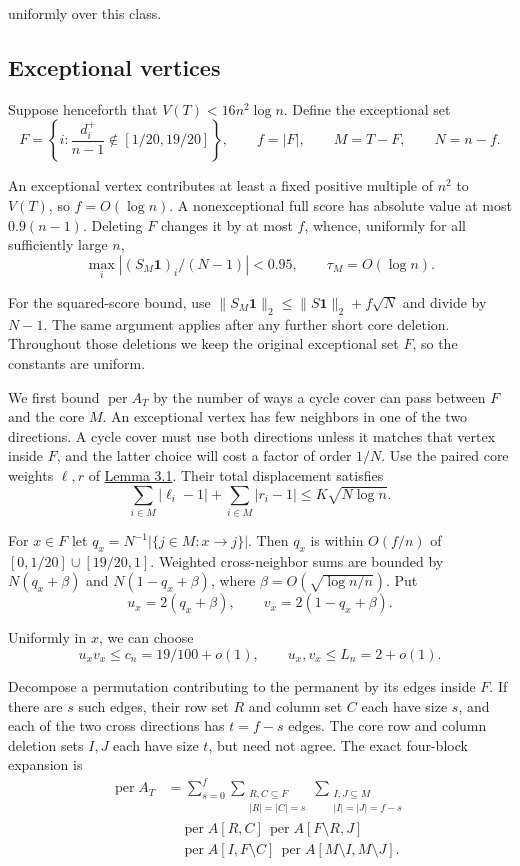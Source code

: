 \documentclass[11pt,a4paper]{article}
\newcommand{\paperref}[2]{\hyperref[#1]{#2}}
\begin{document}
uniformly over this class.

\subsection{Exceptional vertices}\label{sec-3.3}

Suppose henceforth that \(V(T)<16n^2\log n\). Define the exceptional set
\[F=\left\{i:\frac{d_i^+}{n-1}\notin[1/20,19/20]\right\},
\qquad f=|F|,\qquad M=T-F,\qquad N=n-f.\]

An exceptional vertex contributes at least a fixed positive multiple of \(n^2\) to \(V(T)\), so \(f=O(\log n)\). A nonexceptional full score has absolute value at most \(0.9(n-1)\). Deleting \(F\) changes it by at most \(f\), whence, uniformly for all sufficiently large \(n\),
\[\max_i|(S_M\mathbf1)_i/(N-1)|<0.95,\qquad
\tau_M=O(\log n).\]

For the squared-score bound, use \(\|S_M\mathbf1\|_2\le\|S\mathbf1\|_2+f\sqrt N\) and divide by \(N-1\). The same argument applies after any further short core deletion. Throughout those deletions we keep the original exceptional set \(F\), so the constants are uniform.

We first bound \(\operatorname{per}A_T\) by the number of ways a cycle cover can pass between \(F\) and the core \(M\). An exceptional vertex has few neighbors in one of the two directions. A cycle cover must use both directions unless it matches that vertex inside \(F\), and the latter choice will cost a factor of order \(1/N\). Use the paired core weights \(\ell,r\) of \paperref{thm-3.1}{Lemma 3.1}. Their total displacement satisfies
\[\sum_{i\in M}|\ell_i-1|+\sum_{i\in M}|r_i-1|
\le K\sqrt{N\log n}.\]

For \(x\in F\) let \(q_x=N^{-1}|\{j\in M:x\to j\}|\). Then \(q_x\) is within \(O(f/n)\) of \([0,1/20]\cup[19/20,1]\). Weighted cross-neighbor sums are bounded by \(N(q_x+\beta)\) and \(N(1-q_x+\beta)\), where \(\beta=O(\sqrt{\log n/n})\). Put
\[u_x=2(q_x+\beta),\qquad v_x=2(1-q_x+\beta).\]

Uniformly in \(x\), we can choose
\[u_xv_x\le c_n=19/100+o(1),\qquad u_x,v_x\le L_n=2+o(1).\]

Decompose a permutation contributing to the permanent by its edges inside \(F\). If there are \(s\) such edges, their row set \(R\) and column set \(C\) each have size \(s\), and each of the two cross directions has \(t=f-s\) edges. The core row and column deletion sets \(I,J\) each have size \(t\), but need not agree. The exact four-block expansion is
\[\begin{aligned}
\operatorname{per}A_T
&=\sum_{s=0}^{f}
\sum_{\substack{R,C\subseteq F\\|R|=|C|=s}}
\sum_{\substack{I,J\subseteq M\\|I|=|J|=f-s}}
\\&\quad\operatorname{per}A[R,C]\,
\operatorname{per}A[F\setminus R,J]\,
\\&\quad\operatorname{per}A[I,F\setminus C]\,
\operatorname{per}A[M\setminus I,M\setminus J].
\end{aligned}\]
\end{document}
